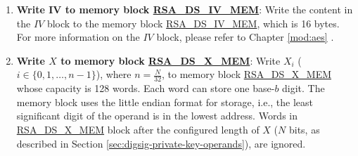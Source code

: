 \documentclass[main\_\_EN.tex]{subfiles}
\begin{document}
\begin{enumerate}
    If the software does not read 0 in \hyperref[regdesc:RSADSQUERYBUSYREG]{RSA\_DS\_QUERY\_BUSY\_REG} after approximately 1 ms, it indicates a problem with HMAC initialization. In such a case, the software can read register \hyperref[regdesc:RSADSQUERYKEYWRONGREG]{RSA\_DS\_QUERY\_KEY\_WRONG\_REG} to get more information:

    \begin{itemize}

        \item If the software reads 0 in \hyperref[regdesc:RSADSQUERYKEYWRONGREG]{RSA\_DS\_QUERY\_KEY\_WRONG\_REG}, it indicates that the HMAC peripheral has not been called.

        \item If the software reads any value from 1 to 15 in \hyperref[regdesc:RSADSQUERYKEYWRONGREG]{RSA\_DS\_QUERY\_KEY\_WRONG\_REG}, it indicates that HMAC was called, but the RSA\_DS peripheral did not successfully get the \begin{math}RSA\_DS\_KEY\end{math} value from the HMAC peripheral. This may indicate that the HMAC operation has been interrupted due to a software concurrency problem.

    \end{itemize}

    \item {\bfseries Write IV to memory block \hyperref[RSADSIVMEM]{RSA\_DS\_IV\_MEM}}: Write the content in the \begin{math}IV\end{math} block to the memory block \hyperref[RSADSIVMEM]{RSA\_DS\_IV\_MEM}, which is 16 bytes. For more information on the \begin{math}IV\end{math} block, please refer to Chapter \ref{mod:aes} \textit{}.

    \item {\bfseries Write \begin{math}X\end{math} to memory block \hyperref[RSADSXMEM]{RSA\_DS\_X\_MEM}}: Write \begin{math}X_{i}\end{math}
        (\begin{math}i \in \{ 0, 1, \dots, n-1 \} \end{math}), where \begin{math} n = \frac{N}{32} \end{math}, to memory block \hyperref[RSADSXMEM]{RSA\_DS\_X\_MEM} whose capacity is 128 words. Each word can store one base-\begin{math}b\end{math} digit. The memory block uses the little endian format for storage, i.e., the least significant digit of the operand is in the lowest address. Words in \hyperref[RSADSXMEM]{RSA\_DS\_X\_MEM} block after the configured length of \begin{math}X\end{math} (\begin{math}N\end{math} bits, as described in Section \ref{sec:digsig-private-key-operands}), are ignored.


\end{enumerate}
\end{document}
